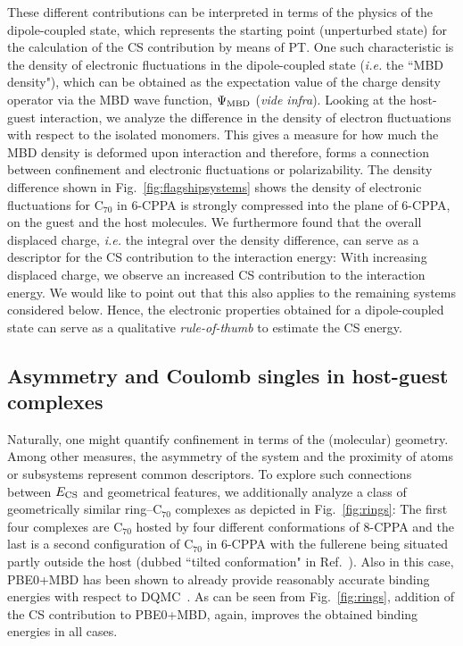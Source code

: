 \documentclass[aps,prl,groupaddress, twocolumn]{revtex4-1}
\begin{document}
These different contributions can be interpreted in terms of the physics of the dipole-coupled state, which represents the starting point (unperturbed state) for the calculation of the CS contribution by means of PT.
One such characteristic is the density of electronic fluctuations in the dipole-coupled state (\textit{i.e.} the ``MBD density"), which can be obtained as the expectation value of the charge density operator via the MBD wave function, $\Psi_{\rm MBD}$ (\textit{vide infra}).
Looking at the host-guest interaction, we analyze the difference in the density of electron fluctuations with respect to the isolated monomers.
This gives a measure for how much the MBD density is deformed upon interaction and therefore, forms a connection between confinement and electronic fluctuations or polarizability. 
The density difference shown in Fig.~\ref{fig:flagshipsystems}%
shows the density of electronic fluctuations for C$_{70}$ in 6-CPPA is strongly compressed into the plane of 6-CPPA, on the guest and the host molecules.
We furthermore found that the overall displaced charge, \textit{i.e.} the integral over the density difference, can serve as a descriptor for the CS contribution to the interaction energy:
With increasing displaced charge, we observe an increased CS contribution to the interaction energy. We would like to point out that this also applies to the remaining systems considered below.
Hence, the electronic properties obtained for a dipole-coupled state can serve as a qualitative \emph{rule-of-thumb} to estimate the CS energy.

\subsection*{Asymmetry and Coulomb singles in host-guest complexes}
Naturally, one might quantify confinement in terms of the (molecular) geometry. Among other measures, the asymmetry of the system and the proximity of atoms or subsystems represent common descriptors. To explore such connections between $E_{\rm CS}$ and geometrical features, we additionally analyze a class of geometrically similar ring--C$_{70}$ complexes as depicted in Fig.~\ref{fig:rings}: The first four complexes are C$_{70}$ hosted by four different conformations of 8-CPPA and the last is a second configuration of C$_{70}$ in 6-CPPA with the fullerene being situated partly outside the host (dubbed ``tilted conformation" in Ref.~\cite{hermann_ncomm2017}). Also in this case, PBE0+MBD has been shown to already provide reasonably accurate binding energies with respect to DQMC~\cite{hermann_ncomm2017}. As can be seen from Fig.~\ref{fig:rings}, addition of the CS contribution to PBE0+MBD, again, improves the obtained binding energies in all cases.
\end{document}
